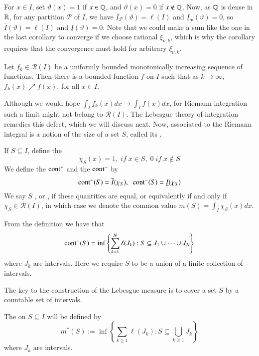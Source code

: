 \begin{example}
    For $x \in I$, set $\vartheta(x) = 1$ if $x \in \mathbb Q$, and $\vartheta(x) = 0$ if $x \notin \mathbb Q$. Now, as $\mathbb Q$ is dense in $\mathbb R$, for any partition $\mathcal{P}$ of $I$, we have $\overline{I}_{\mathcal{P}}(\vartheta) = \ell(I)$ and $\underline{I}_{\mathcal{P}}(\vartheta) = 0$, so $\overline{I}(\vartheta) = \ell(I)$ and $\underline{I}(\vartheta) = 0$. Note that we could make a sum like the one in the last corollary to converge if we choose rational $\xi_{\nu,k}$, which is why the corollary requires that the convergence must hold for arbitrary $\xi_{\nu,k}$.
\end{example}

\begin{proposition}
    Let $f_k \in \mathcal{R}(I)$ be a uniformly bounded monotonically increasing sequence of functions. Then there is a bounded function $f$ on $I$ such that as $k\rightarrow \infty$, $f_k(x)\nearrow f(x)$, for all $x \in I$.
\end{proposition}

Although we would hope $\int_If_k(x)dx\rightarrow \int_If(x)dx$, for Riemann integration such a limit might not belong to $\mathcal{R}(I)$. The Lebesgue theory of integration remedies this defect, which we will discuss next. Now, associated to the Riemann integral is a notion of the size of a set $S$, called its .

\begin{definition}
    If $S \subseteq I$, define the  $$\chi_S(x) = 1,\;if\;x\in S,\;0\;if\;x\notin S$$ We define the  $\text{cont}^+$ and the  $\text{cont}^-$ by $$\text{cont}^+(S) = \overline{I}(\chi_S),\;\;\text{cont}^-(S) = \underline{I}(\chi_S)$$
    We say $S$ , or , if these quantities are equal, or equivalently if and only if $\chi_S \in \mathcal{R}(I)$, in which case we denote the common value $m(S) = \int_I\chi_S(x)dx$.
\end{definition}

From the definition we have that $$\text{cont}^+(S) = \inf\left\{\sum_{k=1}^N\ell(J_k):S \subseteq J_1\cup \cdots \cup J_N\right\}$$
where $J_k$ are intervals. Here we require $S$ to be a union of a finite collection of intervals.

The key to the construction of the Lebesgue measure is to cover a set $S$ by a countable set of intervals. 

\begin{definition}
    The  on $S \subseteq I$ will be defined by $$m^*(S) := \inf\left\{\sum_{k\geq 1}\ell(J_k):S\subseteq \bigcup_{k\geq 1}J_k\right\}$$ where $J_k$ are intervals.
\end{definition}

